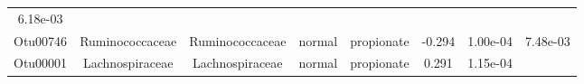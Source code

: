 \documentclass[11pt,]{article}
\begin{document}
\begin{longtable}[]{@{}cccccccc@{}}
\begin{minipage}[t]{0.08\columnwidth}
6.18e-03\strut
\end{minipage}\tabularnewline
\begin{minipage}[t]{0.08\columnwidth}\centering\strut
Otu00746\strut
\end{minipage} & \begin{minipage}[t]{0.15\columnwidth}\centering\strut
Ruminococcaceae\strut
\end{minipage} & \begin{minipage}[t]{0.15\columnwidth}\centering\strut
Ruminococcaceae\strut
\end{minipage} & \begin{minipage}[t]{0.08\columnwidth}\centering\strut
normal\strut
\end{minipage} & \begin{minipage}[t]{0.09\columnwidth}\centering\strut
propionate\strut
\end{minipage} & \begin{minipage}[t]{0.07\columnwidth}\centering\strut
-0.294\strut
\end{minipage} & \begin{minipage}[t]{0.08\columnwidth}\centering\strut
1.00e-04\strut
\end{minipage} & \begin{minipage}[t]{0.08\columnwidth}\centering\strut
7.48e-03\strut
\end{minipage}\tabularnewline
\begin{minipage}[t]{0.08\columnwidth}\centering\strut
Otu00001\strut
\end{minipage} & \begin{minipage}[t]{0.15\columnwidth}\centering\strut
Lachnospiraceae\strut
\end{minipage} & \begin{minipage}[t]{0.15\columnwidth}\centering\strut
Lachnospiraceae\strut
\end{minipage} & \begin{minipage}[t]{0.08\columnwidth}\centering\strut
normal\strut
\end{minipage} & \begin{minipage}[t]{0.09\columnwidth}\centering\strut
propionate\strut
\end{minipage} & \begin{minipage}[t]{0.07\columnwidth}\centering\strut
0.291\strut
\end{minipage} & \begin{minipage}[t]{0.08\columnwidth}\centering\strut
1.15e-04\strut
\end{minipage} & \begin{minipage}[t]{0.08\columnwidth}\centering\strut

\end{minipage}
\end{longtable}
\end{document}
